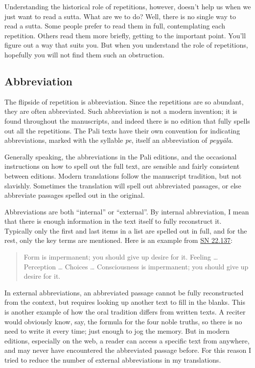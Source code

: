 \documentclass[12pt,openany]{book}%
\begin{document}
Understanding the historical role of repetitions, however, doesn’t help us when we just want to read a sutta. What are we to do? Well, there is no single way to read a sutta. Some people prefer to read them in full, contemplating each repetition. Others read them more briefly, getting to the important point. You’ll figure out a way that suits you. But when you understand the role of repetitions, hopefully you will not find them such an obstruction.

\subsection*{Abbreviation}

The flipside of repetition is abbreviation. Since the repetitions are so abundant, they are often abbreviated. Such abbreviation is not a modern invention; it is found throughout the manuscripts, and indeed there is no edition that fully spells out all the repetitions. The Pali texts have their own convention for indicating abbreviations, marked with the syllable \textit{pe}, itself an abbreviation of \textit{\textsanskrit{peyyāla}}.

Generally speaking, the abbreviations in the Pali editions, and the occasional instructions on how to spell out the full text, are sensible and fairly consistent between editions. Modern translations follow the manuscript tradition, but not slavishly. Sometimes the translation will spell out abbreviated passages, or else abbreviate passages spelled out in the original.

Abbreviations are both “internal” or “external”. By internal abbreviation, I mean that there is enough information in the text itself to fully reconstruct it. Typically only the first and last items in a list are spelled out in full, and for the rest, only the key terms are mentioned. Here is an example from \href{/sn22.137}{SN 22.137}:

\begin{quotation}%
Form is impermanent; you should give up desire for it. Feeling … Perception … Choices … Consciousness is impermanent; you should give up desire for it.

%
\end{quotation}

In external abbreviations, an abbreviated passage cannot be fully reconstructed from the context, but requires looking up another text to fill in the blanks. This is another example of how the oral tradition differs from written texts. A reciter would obviously know, say, the formula for the four noble truths, so there is no need to write it every time; just enough to jog the memory. But in modern editions, especially on the web, a reader can access a specific text from anywhere, and may never have encountered the abbreviated passage before. For this reason I tried to reduce the number of external abbreviations in my translations.
\end{document}
